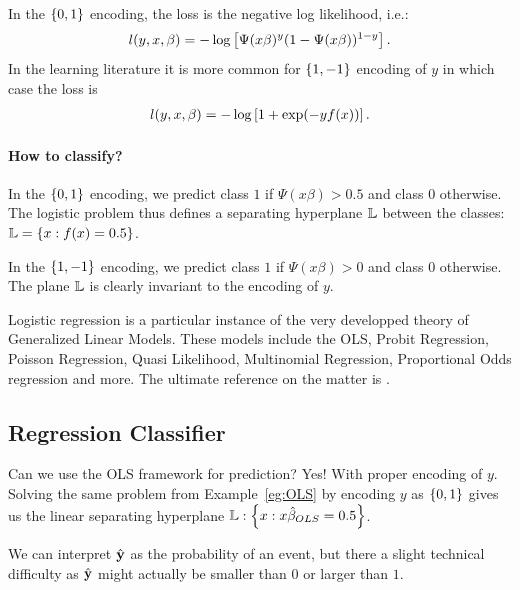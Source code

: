 In the $\left\{ 0,1 \right\}$ encoding, the loss is the negative log likelihood, i.e.:
\begin{align}
	l(y,x,\beta) = -\log \left[ \Psi(x\beta)^{y} (1-\Psi(x\beta))^{1-y}  \right].
\end{align}
In the learning literature it is more common for $\left\{ 1,-1 \right\}$ encoding of $y$ in which case the loss is 
\begin{align}
	l(y,x,\beta) = -\log \left[ 1+\exp(-y f(x))  \right].
\end{align}


\paragraph{How to classify?}
In the $\left\{ 0,1 \right\}$ encoding, we predict class $1$ if $\Psi(x\beta)>0.5$ and class $0$ otherwise.
The logistic problem thus defines a separating hyperplane $\mathbb{L}$ between the classes: $\mathbb{L}=\left\{ x:f(x)=0.5 \right\}$.

In the $\left\{ 1,-1 \right\}$ encoding, we predict class $1$ if $\Psi(x\beta)>0$ and class $0$ otherwise.
The plane $\mathbb{L}$ is clearly invariant to the encoding of $y$.




\begin{remark}[GLMs]
Logistic regression is a particular instance of the very developped theory of Generalized Linear Models.
These models include the OLS, Probit Regression, Poisson Regression, Quasi Likelihood, Multinomial Regression, Proportional Odds regression and more.
The ultimate reference on the matter is \cite{mccullagh_generalized_1989}.
\end{remark}




\subsection{Regression Classifier}
\label{sec:regression_classifier}
Can we use the OLS framework for prediction? Yes! With proper encoding of $y$.
Solving the same problem from Example~\ref{eg:OLS} by encoding $y$ as $\left\{ 0,1 \right\}$ gives us the linear separating hyperplane $\mathbb{L}: \left\{ x:x\hat{\mathbf{\beta}}_{OLS}=0.5 \right\}$.

\begin{remark}
We can interpret $\hat{\mathbf{y}}$ as the probability of an event, but there a slight technical difficulty as $\hat{\mathbf{y}}$ might actually be smaller than $0$ or larger than $1$.
\end{remark}




